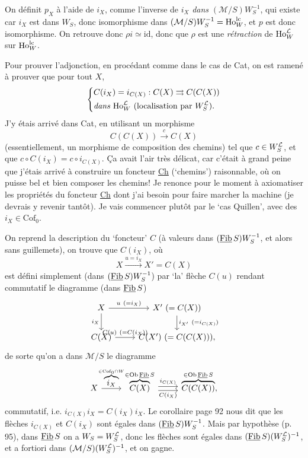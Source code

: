 On définit $p_X$ à l'aide de $i_X$, comme l'inverse de $i_X$ \textit{dans} $(\mathcal{M}/S)W_S^{-1}$, qui existe car  $i_X$ est dans $W_S$, donc isomorphisme dans $(\mathcal{M}/S)W_S^{-1} = \mathrm{Ho}_W^{\mathrm{lc}}$, et $p$ est donc isomorphisme. On retrouve donc $\rho i \simeq \mathrm{id}$, donc que $\rho$ est une \textit{rétraction} de $\mathrm{Ho}_W^{\mathcal{L}}$ sur $\mathrm{Ho}_W^{\mathrm{lc}}$.

Pour prouver l'adjonction, en procédant comme dans le cas de Cat, on est ramené à prouver que pour tout $X$,
\[
\left\{
\begin{aligned}
&C(i_X) = i_{C(X)} : C(X) \rightrightarrows C(C(X))\\
&\textit{dans } \mathrm{Ho}_W^{\mathcal{L}} \ (\text{localisation par } W_S^{\mathcal{L}}).
\end{aligned}
\right.
\]
J'y étais arrivé dans Cat, en utilisant un morphisme
\[
C(C(X)) \xrightarrow{\ c\ } C(X)
\]
(essentiellement, un morphisme de composition des chemins) tel que $c \in W_S^{\mathcal{L}}$, et que $c \circ C(i_X) = c \circ i_{C(X)}$. Ça avait l'air très délicat, car c'était à grand peine que j'étais arrivé à construire un foncteur \underline{Ch} (`chemins') raisonnable, où on puisse bel et bien composer les chemins! Je renonce pour le moment à axiomatiser les propriétés du foncteur \underline{Ch} dont j'ai besoin pour faire marcher la machine (je devrais y revenir tantôt). Je vais commencer plutôt par le `cas Quillen', avec des $i_X \in \mathrm{Cof}_0$.


On reprend la description du `foncteur' $C$ (à valeurs dans $(\underline{\mathrm{Fib}}\, S)W_S^{-1}$, et alors sans guillemets), on trouve que $C(i_X)$, où
\[
X \xrightarrow{u = i_X} X' = C(X)
\]
est défini simplement (dans $(\underline{\mathrm{Fib}}\, S)W_S^{-1}$) par `la' flèche $C(u)$ rendant commutatif le diagramme (dans $\underline{\mathrm{Fib}}\, S$)
\[
\begin{tikzcd}
X \arrow[r, "u\ (=i_X)"] \arrow[d, "i_X"'] & X'\ (= C(X)) \arrow[d, "i_{X'}\ (=i_{C(X)})"] \\
C(X) \arrow[r, "C(u)\ (=C(i_X))"] & C(X')\ (= C(C(X))),
\end{tikzcd}
\]
de sorte qu'on a dans $\mathcal{M}/S$ le diagramme
\[
\begin{tikzcd}
X \arrow[r, "\overbrace{i_X}^{\in\mathrm{Cof}_0\cap W}"] & \overbrace{C(X)}^{\in\mathrm{Ob}\,\Fibu S} \arrow[r, shift left, "i_{C(X)}"] \arrow[r, shift right, "C(i_X)"'] & \overbrace{C(C(X))}^{\in\mathrm{Ob}\,\Fibu S},
\end{tikzcd}
\]
commutatif, i.e. $i_{C(X)}i_X = C(i_X)i_X$. Le corollaire page 92 nous dit que les flèches $i_{C(X)}$ et $C(i_X)$ sont égales dans $(\underline{\mathrm{Fib}}\, S)W_S^{-1}$. Mais par hypothèse (p. 95), dans $\underline{\mathrm{Fib}}\, S$ on a $W_S = W_S^{\mathcal{L}}$, donc les flèches sont égales dans $(\underline{\mathrm{Fib}}\, S)(W_S^{\mathcal{L}})^{-1}$, et a fortiori dans $(\mathcal{M}/S)(W_S^{\mathcal{L}})^{-1}$, et on gagne.

